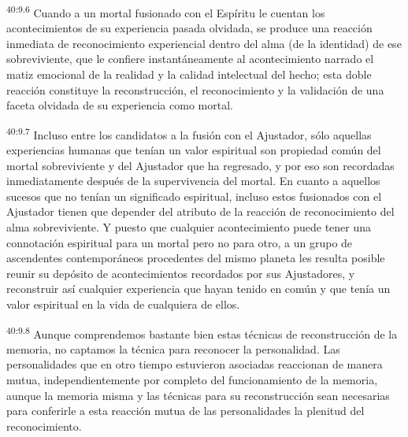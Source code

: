\par
\textsuperscript{40:9.6} Cuando a un mortal fusionado con el Espíritu le cuentan los acontecimientos de su experiencia pasada olvidada, se produce una reacción inmediata de reconocimiento experiencial dentro del alma (de la identidad) de ese sobreviviente, que le confiere instantáneamente al acontecimiento narrado el matiz emocional de la realidad y la calidad intelectual del hecho; esta doble reacción constituye la reconstrucción, el reconocimiento y la validación de una faceta olvidada de su experiencia como mortal.

\par
\textsuperscript{40:9.7} Incluso entre los candidatos a la fusión con el Ajustador, sólo aquellas experiencias humanas que tenían un valor espiritual son propiedad común del mortal sobreviviente y del Ajustador que ha regresado, y por eso son recordadas inmediatamente después de la supervivencia del mortal. En cuanto a aquellos sucesos que no tenían un significado espiritual, incluso estos fusionados con el Ajustador tienen que depender del atributo de la reacción de reconocimiento del alma sobreviviente. Y puesto que cualquier acontecimiento puede tener una connotación espiritual para un mortal pero no para otro, a un grupo de ascendentes contemporáneos procedentes del mismo planeta les resulta posible reunir su depósito de acontecimientos recordados por sus Ajustadores, y reconstruir así cualquier experiencia que hayan tenido en común y que tenía un valor espiritual en la vida de cualquiera de ellos.

\par
\textsuperscript{40:9.8} Aunque comprendemos bastante bien estas técnicas de reconstrucción de la memoria, no captamos la técnica para reconocer la personalidad. Las personalidades que en otro tiempo estuvieron asociadas reaccionan de manera mutua, independientemente por completo del funcionamiento de la memoria, aunque la memoria misma y las técnicas para su reconstrucción sean necesarias para conferirle a esta reacción mutua de las personalidades la plenitud del reconocimiento.

